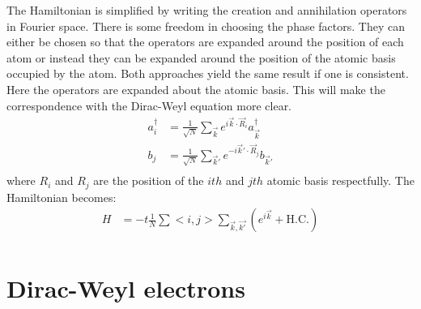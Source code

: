 The Hamiltonian is simplified by writing the creation and annihilation operators in Fourier space.
There is some freedom in choosing the phase factors.
They can either be chosen so that the operators are expanded around the position of each atom or instead they can be expanded around the position of the atomic basis occupied by the atom.
Both approaches yield the same result if one is consistent\cite{Bena2009}.
Here the operators are expanded about the atomic basis.
This will make the correspondence with the Dirac-Weyl equation more clear.
\begin{align*}
	a_i^{\dagger}&=\frac{1}{\sqrt{N}}\sum_{\vec{k} } e^{ i \vec{k}  \cdot \vec{R}_i} a_{\vec{k} }^{\dagger} \\
	b_j          &=\frac{1}{\sqrt{N}}\sum_{\vec{k}'} e^{-i \vec{k}' \cdot \vec{R}_j} b_{\vec{k}'} \\
\end{align*}
where $R_i$ and $R_j$ are the position of the $ith$ and $jth$ atomic basis respectfully.  The Hamiltonian becomes:
\begin{align}
	H&=-t \frac{1}{N} \sum{<i,j>}\sum_{\vec{k},\vec{k'}}(e^{i \vec{k}}+\text{H.C.})\\
	& \label{eq:TB:RealSpace}
\end{align}

\section{Dirac-Weyl electrons}